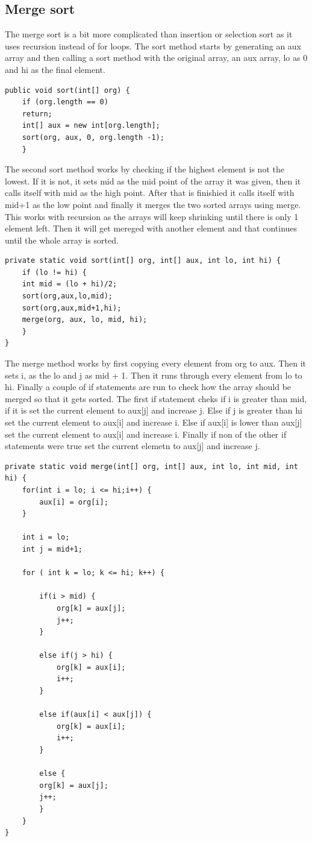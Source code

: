 \documentclass[a4paper,11pt]{article}
\begin{document}
\subsection*{Merge sort}
The merge sort is a bit more complicated than insertion or selection sort as it uses recursion instead of for loops.
The sort method starts by generating an aux array and then calling a sort method with the original array, an aux array, lo as 0 and hi as the final element.
\begin{verbatim}
public void sort(int[] org) {
    if (org.length == 0)
    return;
    int[] aux = new int[org.length];
    sort(org, aux, 0, org.length -1);
    }
\end{verbatim}
The second sort method works by checking if the highest element is not the lowest. If it is not, it sets mid as the mid point of the array it was given, then
it calls itself with mid as the high point. After that is finishied it calls itself with mid+1 as the low point and finally it merges the two sorted arrays using merge. 
This works with recursion as the arrays will keep shrinking until there is only 1 element left. Then it will get mereged with another element and that continues until the whole 
array is sorted.
\begin{verbatim}
private static void sort(int[] org, int[] aux, int lo, int hi) {
    if (lo != hi) {
    int mid = (lo + hi)/2;
    sort(org,aux,lo,mid);
    sort(org,aux,mid+1,hi);
    merge(org, aux, lo, mid, hi);
    }
}
\end{verbatim}
The merge method works by first copying every element from org to aux. Then it sets i, as the lo and j as mid + 1. Then it runs through every element from lo to hi.
Finally a couple of if statements are run to check how the array should be merged so that it gets sorted.
The first if statement cheks if i is greater than mid, if it is set the current element to aux[j] and increase j.
Else if j is greater than hi set the current element to aux[i] and increase i. Else if aux[i] is lower than aux[j] set the current element to aux[i] and increase i.
Finally if non of the other if statements were true set the current elemetn to aux[j] and increase j.
\begin{verbatim}
private static void merge(int[] org, int[] aux, int lo, int mid, int hi) {
    for(int i = lo; i <= hi;i++) {
        aux[i] = org[i];
    }

    int i = lo;
    int j = mid+1; 

    for ( int k = lo; k <= hi; k++) {
        
        if(i > mid) {
            org[k] = aux[j];
            j++;
        }

        else if(j > hi) {
            org[k] = aux[i];
            i++;
        }

        else if(aux[i] < aux[j]) {
            org[k] = aux[i];
            i++;
        }

        else {
        org[k] = aux[j];
        j++;
        }
    }
}
\end{verbatim}
\end{document}
